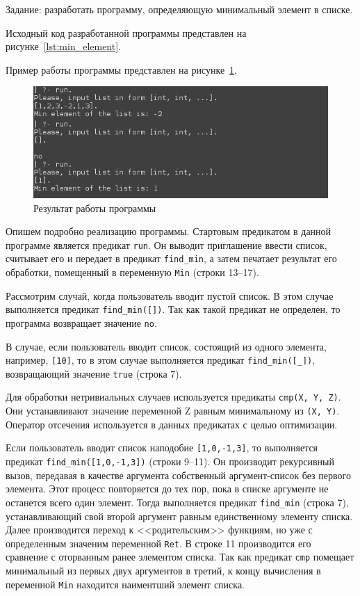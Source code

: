 Задание: разработать программу, определяющую
минимальный элемент в списке.

Исходный код разработанной программы представлен на
рисунке~\ref{lst:min_element}.



Пример работы программы представлен на рисунке~\ref{fig:min_element}.

\begin{figure}[h!]
  \centering
  \includegraphics[width=120mm]{img/min_element}
  \caption{Результат работы программы}
  \label{fig:min_element}
\end{figure}

Опишем подробно реализацию программы.
Стартовым предикатом в данной программе является предикат \texttt{run}.
Он выводит приглашение ввести список, считывает его и передает в предикат
\texttt{find\_min}, а затем печатает результат его обработки,
помещенный в переменную \texttt{Min} (строки 13--17).

Рассмотрим случай, когда пользователь вводит пустой список. 
В этом случае выполняется предикат \texttt{find\_min([])}.
Так как такой предикат не определен, то программа возвращает значение \texttt{no}.

В случае, если пользователь вводит список, состоящий из одного элемента, 
например, \texttt{[10]}, то в этом случае выполняется предикат \texttt{find\_min([\_])},
возвращающий значение \texttt{true} (строка 7). 

Для обработки нетривиальных случаев используется предикаты \texttt{cmp(X, Y, Z)}.
Они устанавливают значение переменной Z равным минимальному из \texttt{(X, Y)}.
Оператор отсечения используется в данных предикатах с целью оптимизации.

Если пользователь вводит список наподобие \texttt{[1,0,-1,3]},
то выполняется предикат \texttt{find\_min([1,0,-1,3])} (строки 9--11). 
Он производит рекурсивный вызов, передавая в качестве аргумента
собственный аргумент-список без первого элемента. 
Этот процесс повторяется до тех пор, 
пока в списке аргументе не останется всего один элемент.
Тогда выполняется предикат \texttt{find\_min} (строка 7),
устанавливающий свой второй аргумент равным единственному элементу списка.
Далее производится переход к <<родительским>> функциям, 
но уже с определенным значеним переменной \texttt{Ret}.
В строке 11 производится его сравнение с оторванным ранее элементом списка.
Так как предикат \texttt{cmp} помещает минимальный из первых двух аргументов
в третий, к концу вычисления в переменной \texttt{Min} находится наиментший элемент списка.

